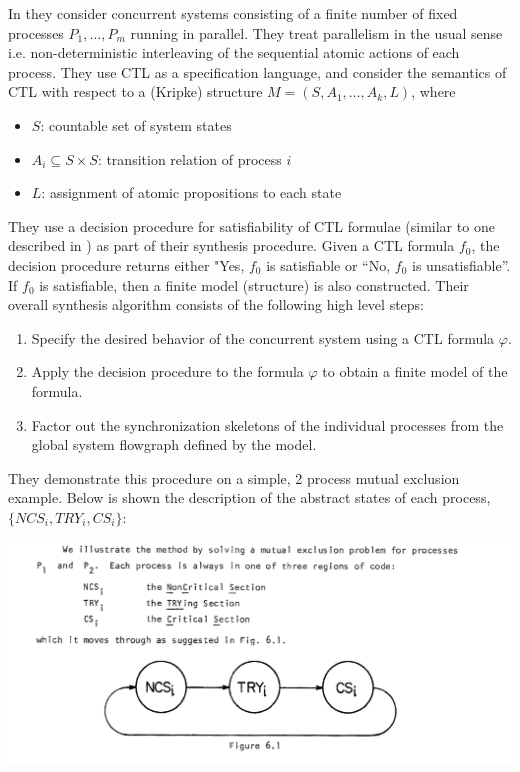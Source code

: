 \documentclass[10pt,a4paper]{article}
\begin{document}
In \cite{1981clarkemerson} they consider concurrent systems consisting of a finite number of fixed processes $P_1,\dots,P_m$ running in parallel. They treat parallelism in the usual sense i.e. non-deterministic interleaving of the sequential atomic actions of each process. They use CTL as a specification language, and consider the semantics of CTL with respect to a (Kripke) structure $M=(S,A_1,\dots,A_k,L)$, where
\begin{itemize}
    \item $S$: countable set of system states
    \item $A_i \subseteq S \times S$: transition relation of process $i$
    \item $L$: assignment of atomic propositions to each state
\end{itemize}
They use a decision procedure for satisfiability of CTL formulae (similar to one described in \cite{1981benari}) as part of their synthesis procedure. Given a CTL formula $f_0$, the decision procedure returns either "Yes, $f_0$ is satisfiable or ``No, $f_0$ is unsatisfiable''. If $f_0$ is satisfiable, then a finite model (structure) is also constructed. Their overall synthesis algorithm consists of the following high level steps:
\begin{enumerate}
    \item Specify the desired behavior of the concurrent system using a CTL formula $\varphi$.
    \item Apply the decision procedure to the formula $\varphi$ to obtain a finite model of the formula.
    \item Factor out the synchronization skeletons of the individual processes from the global system flowgraph defined by the model.
\end{enumerate}
They demonstrate this procedure on a simple, 2 process mutual exclusion example. Below is shown the description of the abstract states of each process, $\{NCS_i, TRY_i, CS_i\}$: 
\begin{center}
    \includegraphics[scale=0.4]{images/mutex_processes.png}
\end{center}
\end{document}
